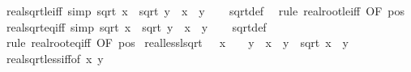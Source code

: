 \begin{isabellebody}
{\isafoldproof}%
%
\isadelimproof
\isanewline
%
\endisadelimproof
\isanewline
{}\isamarkupfalse%
\ real{\isacharunderscore}{\kern0pt}sqrt{\isacharunderscore}{\kern0pt}le{\isacharunderscore}{\kern0pt}iff\ {\isacharbrackleft}{\kern0pt}simp{\isacharbrackright}{\kern0pt}{\isacharcolon}{\kern0pt}\ {\isachardoublequoteopen}sqrt\ x\ {\isasymle}\ sqrt\ y\ {\isasymlongleftrightarrow}\ x\ {\isasymle}\ y{\isachardoublequoteclose}\isanewline
%
\isadelimproof
\ \ %
\endisadelimproof
%
\isatagproof
{}\isamarkupfalse%
\ sqrt{\isacharunderscore}{\kern0pt}def\ \isamarkupfalse%
\ {\isacharparenleft}{\kern0pt}rule\ real{\isacharunderscore}{\kern0pt}root{\isacharunderscore}{\kern0pt}le{\isacharunderscore}{\kern0pt}iff\ {\isacharbrackleft}{\kern0pt}OF\ pos{}{\isacharbrackright}{\kern0pt}{\isacharparenright}{\kern0pt}%
\endisatagproof
{\isafoldproof}%
%
\isadelimproof
\isanewline
%
\endisadelimproof
\isanewline
{}\isamarkupfalse%
\ real{\isacharunderscore}{\kern0pt}sqrt{\isacharunderscore}{\kern0pt}eq{\isacharunderscore}{\kern0pt}iff\ {\isacharbrackleft}{\kern0pt}simp{\isacharbrackright}{\kern0pt}{\isacharcolon}{\kern0pt}\ {\isachardoublequoteopen}sqrt\ x\ {\isacharequal}{\kern0pt}\ sqrt\ y\ {\isasymlongleftrightarrow}\ x\ {\isacharequal}{\kern0pt}\ y{\isachardoublequoteclose}\isanewline
%
\isadelimproof
\ \ %
\endisadelimproof
%
\isatagproof
{}\isamarkupfalse%
\ sqrt{\isacharunderscore}{\kern0pt}def\ \isamarkupfalse%
\ {\isacharparenleft}{\kern0pt}rule\ real{\isacharunderscore}{\kern0pt}root{\isacharunderscore}{\kern0pt}eq{\isacharunderscore}{\kern0pt}iff\ {\isacharbrackleft}{\kern0pt}OF\ pos{}{\isacharbrackright}{\kern0pt}{\isacharparenright}{\kern0pt}%
\endisatagproof
{\isafoldproof}%
%
\isadelimproof
\isanewline
%
\endisadelimproof
\isanewline
{}\isamarkupfalse%
\ real{\isacharunderscore}{\kern0pt}less{\isacharunderscore}{\kern0pt}lsqrt{\isacharcolon}{\kern0pt}\ {\isachardoublequoteopen}{}\ {\isasymle}\ x\ {\isasymLongrightarrow}\ {}\ {\isasymle}\ y\ {\isasymLongrightarrow}\ x\ {\isacharless}{\kern0pt}\ y\ {\isasymLongrightarrow}\ sqrt\ x\ {\isacharless}{\kern0pt}\ y{\isachardoublequoteclose}\isanewline
%
\isadelimproof
\ \ %
\endisadelimproof
%
\isatagproof
{}\isamarkupfalse%
\ real{\isacharunderscore}{\kern0pt}sqrt{\isacharunderscore}{\kern0pt}less{\isacharunderscore}{\kern0pt}iff{\isacharbrackleft}{\kern0pt}of\ x\ {\isachardoublequoteopen}y\ \isamarkupfalse%

\end{isabellebody}
